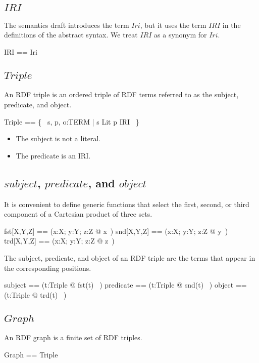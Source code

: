 \documentclass{article}
\begin{document}
\subsection{$IRI$}
The semantics draft introduces the term $Iri$, but it uses the term $IRI$ in the definitions of the abstract syntax.
We treat $IRI$ as a synonym for $Iri$.
\begin{zed}
	IRI == Iri
\end{zed}

\subsection{$Triple$}
An RDF triple is an ordered triple of RDF terms referred to as the subject, predicate, and object.
\begin{zed}
	Triple == \{~ s, p, o:TERM | s \notin Lit \land p \in IRI ~\}
\end{zed}
\begin{itemize}
\item The subject is not a literal.
\item The predicate is an IRI.
\end{itemize}

\subsection{$subject$, $predicate$, and $object$}
It is convenient to define generic functions that select the first, second, or third component of a Cartesian product of three sets.
\begin{zed}
	fst[X,Y,Z] == (\lambda x:X; y:Y; z:Z @ x~)
\also
	snd[X,Y,Z] == (\lambda x:X; y:Y; z:Z @ y~)
\also
	trd[X,Y,Z] == (\lambda x:X; y:Y; z:Z @ z~)
\end{zed}

The subject, predicate, and object of an RDF triple are the terms that appear in the corresponding positions.
\begin{zed}
	subject == (\lambda t:Triple @ fst(t) ~)
\also
	predicate == (\lambda t:Triple @ snd(t) ~)
\also
	object == (\lambda t:Triple @ trd(t) ~)
\end{zed}

\subsection{$Graph$}
An RDF graph is a finite set of RDF triples.
\begin{zed}
	Graph == \finset Triple
\end{zed}
\end{document}
